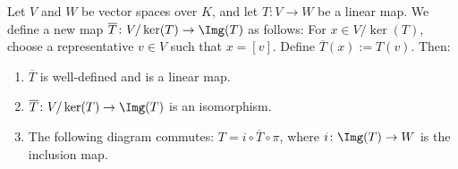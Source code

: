 \begin{theorem}
  \label{thm:first_isomorphism}
  Let $V$ and $W$ be vector spaces over $K$, and let $T \colon V \to W$ be a linear map. We define a new map $\overline{T} \colon V/\ker(T) \to \Img(T)$ as follows: For $x \in V/\ker(T)$, choose a representative $v \in V$ such that $x = [v]$. Define $\overline{T}(x) := T(v)$. Then:
  \begin{enumerate}
    \item $\overline{T}$ is well-defined and is a linear map.
    \item $\overline{T} \colon V/\ker(T) \to \Img(T)$ is an isomorphism.
    \item {The following diagram commutes: $T = i \circ \overline{T} \circ \pi$, where $i \colon \Img(T) \to W$ is the inclusion map.
      \begin{center}
      \end{center}
    }

  \end{enumerate}
\end{theorem}

